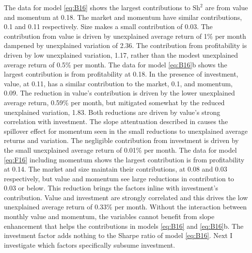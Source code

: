 The data for model \ref{eq:B16} shows the largest contributions to
$\text{Sh}^2$ are from value and momentum at 0.18.
The market and momentum have similar contributions, 0.1 and 0.11 respectively.
Size makes a small contribution of 0.03.
The contribution from value is driven by unexplained average return of 1\% per
month dampened by unexplained variation of 2.36.
The contribution from profitability is driven by low unexplained variation,
1.17, rather than the modest unexplained average return of 0.5\% per month.
The data for model \ref{eq:B16}b shows the largest contribution is
from profitability at 0.18.
In the presence of investment, value, at 0.11, has a similar contribution to
the market, 0.1, and momentum, 0.09.
The reduction in value's contribution is driven by the lower unexplained
average return, 0.59\% per month, but mitigated somewhat by the reduced
unexplained variation, 1.83.
Both reductions are driven by value's strong correlation with investment.
The slope attentuation described in \textcite{fama2015incremental} causes the
spillover effect for momentum seen in the small reductions to unexplained
average returns and variation.
The negligible contribution from investment is driven by the small unexplained
average return of 0.01\% per month.
The data for model \ref{eq:F16} including momentum shows the largest
contribution is from profitability at 0.14.
The market and size maintain their contributions, at 0.08 and 0.03
respectively, but value and momentum see large reductions in contribution to
0.03 or below.
This reduction brings the factors inline with investment's contribution.
Value and investment are strongly correlated and this drives the low
unexplained average return of 0.33\% per month.
Without the interaction between monthly value and momentum, the variables
cannot benefit from slope enhancement that helps the contributions in
models \ref{eq:B16} and \ref{eq:B16}b.
The investment factor adds nothing to the Sharpe ratio of model \ref{eq:B16}.
Next I investigate which factors specifically subsume investment.
